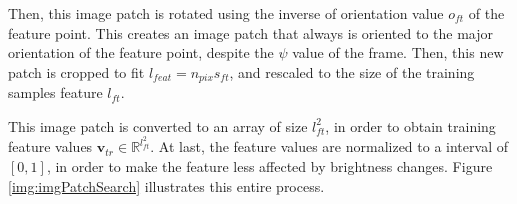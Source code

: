 \documentclass[annual]{acmsiggraph}
\begin{document}

Then, this  image patch is rotated using the inverse of orientation value $o_{ft}$ of the feature point. This creates an image patch that always is oriented to the major orientation of the feature point, despite the $\psi$ value of the frame. Then, this new patch is cropped to fit $l_{feat} = n_{pix}s_{ft}$, and rescaled to the size of the training samples feature $l_{ft}$. 

This image patch is converted to an array of size $l_{ft}^2$, in order to obtain training feature values $\mathbf{v}_{tr} \in \mathbb{R}^{l_{ft}^2}$.  At last, the feature values are normalized to a interval of $[0,1]$, in order to make the feature less affected by brightness changes. Figure \ref{img:imgPatchSearch} illustrates this entire process. 
%
%
\end{document}
